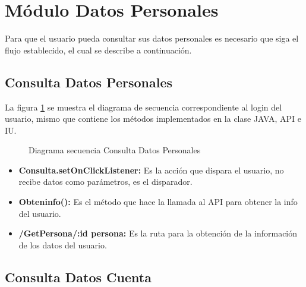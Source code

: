 
\section{Módulo Datos Personales}
Para que el usuario pueda consultar sus datos personales es necesario que siga el flujo establecido, el cual se describe a continuación.\\


\subsection{Consulta Datos Personales}

La figura \ref{fig:SecuenciaDatosPersonales} se muestra el diagrama de secuencia correspondiente al login del usuario, mismo que contiene los métodos implementados en la clase JAVA, API e IU.

\begin{figure}[htbp!]
	\centering
	\caption{Diagrama secuencia Consulta Datos Personales}
	\label{fig:SecuenciaDatosPersonales}
\end{figure}
\begin{itemize}
	\item \textbf{Consulta.setOnClickListener:} Es la acción que dispara el usuario, no recibe datos como parámetros, es el disparador.
	\item \textbf{Obteninfo():} Es el método que hace la llamada al API para obtener la info del usuario.
	\item \textbf{/GetPersona/:id persona:} Es la ruta para la obtención de la información de los datos del usuario.
\end{itemize}

\subsection{Consulta Datos Cuenta}

